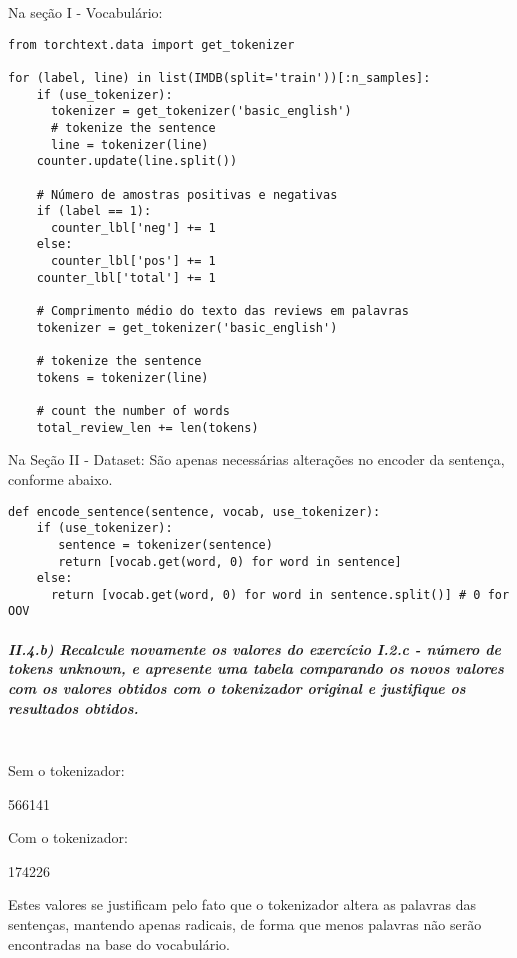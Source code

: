 \documentclass[11pt]{article}
\begin{document}
Na seção I - Vocabulário:

\begin{verbatim}
from torchtext.data import get_tokenizer

for (label, line) in list(IMDB(split='train'))[:n_samples]:
    if (use_tokenizer):
      tokenizer = get_tokenizer('basic_english')
      # tokenize the sentence
      line = tokenizer(line)
    counter.update(line.split())

    # Número de amostras positivas e negativas
    if (label == 1):
      counter_lbl['neg'] += 1
    else:
      counter_lbl['pos'] += 1
    counter_lbl['total'] += 1

    # Comprimento médio do texto das reviews em palavras
    tokenizer = get_tokenizer('basic_english')

    # tokenize the sentence
    tokens = tokenizer(line)

    # count the number of words
    total_review_len += len(tokens)
\end{verbatim}

Na Seção II - Dataset: São apenas necessárias alterações no encoder da
sentença, conforme abaixo.

\begin{verbatim}
def encode_sentence(sentence, vocab, use_tokenizer):
    if (use_tokenizer):
       sentence = tokenizer(sentence)
       return [vocab.get(word, 0) for word in sentence]
    else:
      return [vocab.get(word, 0) for word in sentence.split()] # 0 for OOV
\end{verbatim}

    \subparagraph{II.4.b) Recalcule novamente os valores do exercício I.2.c
- número de tokens unknown, e apresente uma tabela comparando os novos
valores com os valores obtidos com o tokenizador original e justifique
os resultados
obtidos.}\label{ii.4.b-recalcule-novamente-os-valores-do-exercuxedcio-i.2.c---nuxfamero-de-tokens-unknown-e-apresente-uma-tabela-comparando-os-novos-valores-com-os-valores-obtidos-com-o-tokenizador-original-e-justifique-os-resultados-obtidos.}\mbox{} \\

Sem o tokenizador:

566141

Com o tokenizador:

174226

Estes valores se justificam pelo fato que o tokenizador altera as
palavras das sentenças, mantendo apenas radicais, de forma que menos
palavras não serão encontradas na base do vocabulário.
\end{document}
